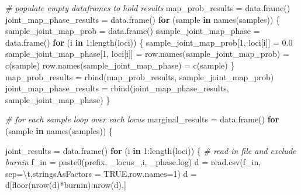 \documentclass[
]{book}
\newenvironment{Shaded}{\begin{snugshade}}{\end{snugshade}}
\newcommand{\AttributeTok}[1]{\textcolor[rgb]{0.77,0.63,0.00}{#1}}
\newcommand{\CommentTok}[1]{\textcolor[rgb]{0.56,0.35,0.01}{\textit{#1}}}
\newcommand{\ConstantTok}[1]{\textcolor[rgb]{0.00,0.00,0.00}{#1}}
\newcommand{\ControlFlowTok}[1]{\textcolor[rgb]{0.13,0.29,0.53}{\textbf{#1}}}
\newcommand{\DecValTok}[1]{\textcolor[rgb]{0.00,0.00,0.81}{#1}}
\newcommand{\FloatTok}[1]{\textcolor[rgb]{0.00,0.00,0.81}{#1}}
\newcommand{\FunctionTok}[1]{\textcolor[rgb]{0.00,0.00,0.00}{#1}}
\newcommand{\NormalTok}[1]{#1}
\newcommand{\OtherTok}[1]{\textcolor[rgb]{0.56,0.35,0.01}{#1}}
\newcommand{\SpecialCharTok}[1]{\textcolor[rgb]{0.00,0.00,0.00}{#1}}
\newcommand{\StringTok}[1]{\textcolor[rgb]{0.31,0.60,0.02}{#1}}
\begin{document}
\begin{Shaded}
\begin{Highlighting}[]
\CommentTok{\# populate empty dataframes to hold results}
\NormalTok{map\_prob\_results }\OtherTok{=} \FunctionTok{data.frame}\NormalTok{()}
\NormalTok{joint\_map\_phase\_results }\OtherTok{=} \FunctionTok{data.frame}\NormalTok{()}
\ControlFlowTok{for}\NormalTok{ (sample }\ControlFlowTok{in} \FunctionTok{names}\NormalTok{(samples)) \{}
\NormalTok{  sample\_joint\_map\_prob }\OtherTok{=} \FunctionTok{data.frame}\NormalTok{()}
\NormalTok{  sample\_joint\_map\_phase }\OtherTok{=} \FunctionTok{data.frame}\NormalTok{()}
  \ControlFlowTok{for}\NormalTok{ (i }\ControlFlowTok{in} \DecValTok{1}\SpecialCharTok{:}\FunctionTok{length}\NormalTok{(loci)) \{}
\NormalTok{    sample\_joint\_map\_prob[}\DecValTok{1}\NormalTok{, loci[i]] }\OtherTok{=} \FloatTok{0.0}
\NormalTok{    sample\_joint\_map\_phase[}\DecValTok{1}\NormalTok{, loci[i]] }\OtherTok{=} \StringTok{\textquotesingle{}\textquotesingle{}}
    \FunctionTok{row.names}\NormalTok{(sample\_joint\_map\_prob) }\OtherTok{=} \FunctionTok{c}\NormalTok{(sample)}
    \FunctionTok{row.names}\NormalTok{(sample\_joint\_map\_phase) }\OtherTok{=} \FunctionTok{c}\NormalTok{(sample)}
\NormalTok{  \}}
\NormalTok{  map\_prob\_results }\OtherTok{=} \FunctionTok{rbind}\NormalTok{(map\_prob\_results, sample\_joint\_map\_prob)}
\NormalTok{  joint\_map\_phase\_results }\OtherTok{=} \FunctionTok{rbind}\NormalTok{(joint\_map\_phase\_results, sample\_joint\_map\_phase)}
\NormalTok{\}}

\CommentTok{\# for each sample loop over each locus}
\NormalTok{marginal\_results }\OtherTok{=} \FunctionTok{data.frame}\NormalTok{()}
\ControlFlowTok{for}\NormalTok{ (sample }\ControlFlowTok{in} \FunctionTok{names}\NormalTok{(samples)) \{}

\NormalTok{  joint\_results }\OtherTok{=} \FunctionTok{data.frame}\NormalTok{()}
  \ControlFlowTok{for}\NormalTok{ (i }\ControlFlowTok{in} \DecValTok{1}\SpecialCharTok{:}\FunctionTok{length}\NormalTok{(loci)) \{}
    \CommentTok{\# read in file and exclude burnin}
\NormalTok{    f\_in }\OtherTok{=} \FunctionTok{paste0}\NormalTok{(prefix, }\StringTok{\textquotesingle{}\_locus\_\textquotesingle{}}\NormalTok{,i, }\StringTok{\textquotesingle{}\_phase.log\textquotesingle{}}\NormalTok{)}
\NormalTok{    d }\OtherTok{=} \FunctionTok{read.csv}\NormalTok{(f\_in, }\AttributeTok{sep=}\StringTok{\textquotesingle{}}\SpecialCharTok{\textbackslash{}t}\StringTok{\textquotesingle{}}\NormalTok{,}\AttributeTok{stringsAsFactors =} \ConstantTok{TRUE}\NormalTok{,}\AttributeTok{row.names=}\DecValTok{1}\NormalTok{)}
\NormalTok{    d }\OtherTok{=}\NormalTok{ d[}\FunctionTok{floor}\NormalTok{(}\FunctionTok{nrow}\NormalTok{(d)}\SpecialCharTok{*}\NormalTok{burnin)}\SpecialCharTok{:}\FunctionTok{nrow}\NormalTok{(d),]}
    

\end{Highlighting}
\end{Shaded}
\end{document}
